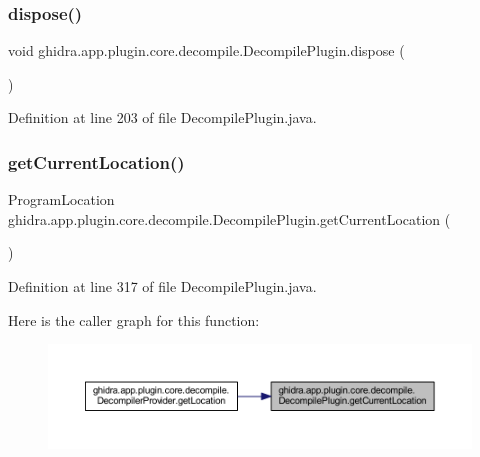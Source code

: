 \subsubsection{\texorpdfstring{dispose()}{dispose()}}
{\footnotesize\ttfamily void ghidra.\+app.\+plugin.\+core.\+decompile.\+Decompile\+Plugin.\+dispose (\begin{DoxyParamCaption}{ }\end{DoxyParamCaption})\hspace{0.3cm}{\ttfamily [inline]}}



Definition at line 203 of file Decompile\+Plugin.\+java.

\mbox{\label{classghidra_1_1app_1_1plugin_1_1core_1_1decompile_1_1_decompile_plugin_aabc9f011dedde6e5957107ec9f327bf6}} 
\subsubsection{\texorpdfstring{getCurrentLocation()}{getCurrentLocation()}}
{\footnotesize\ttfamily Program\+Location ghidra.\+app.\+plugin.\+core.\+decompile.\+Decompile\+Plugin.\+get\+Current\+Location (\begin{DoxyParamCaption}{ }\end{DoxyParamCaption})\hspace{0.3cm}{\ttfamily [inline]}}



Definition at line 317 of file Decompile\+Plugin.\+java.

Here is the caller graph for this function\+:
\nopagebreak
\begin{figure}[H]
\begin{center}
\leavevmode
\includegraphics[width=350pt]{classghidra_1_1app_1_1plugin_1_1core_1_1decompile_1_1_decompile_plugin_aabc9f011dedde6e5957107ec9f327bf6_icgraph}
\end{center}
\end{figure}
\mbox{\label{classghidra_1_1app_1_1plugin_1_1core_1_1decompile_1_1_decompile_plugin_ab5185d2297c3c40d03e34c49bf203138}} 
